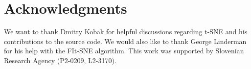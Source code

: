 \documentclass[article]{jss}
\begin{document}
\section*{Acknowledgments}

We want to thank Dmitry Kobak for helpful discussions regarding t-SNE and his
contributions to the source code. We would also like to thank George Linderman
for his help with the FIt-SNE algorithm. This work was supported by Slovenian
Research Agency (P2-0209, L2-3170).




\end{document}
